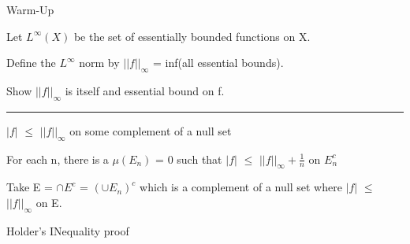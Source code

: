 \begin{tbox}
    Warm-Up

    Let $L^{\infty}(X)$ be the set of essentially bounded functions on X.

    Define the $L^{\infty}$ norm by $||f||_{\infty}$ = inf(all essential bounds).

    Show $||f||_{\infty}$ is itself and essential bound on f.

    \rule[0.1cm]{15.2cm}{0.01cm}

    $|f|$ $\leq$ $||f||_{\infty}$ on some complement of a null set

    For each n, there is a $\mu(E_n)$ = 0 such that
    $|f|$ $\leq$ $||f||_{\infty} + \frac{1}{n}$ on $E_n^c$

    Take E = $\cap E^c$ = $(\cup E_n)^c$ which is a complement of a null set
    where $|f|$ $\leq$ $||f||_{\infty}$ on E.

    Holder's INequality proof

    
\end{tbox}
